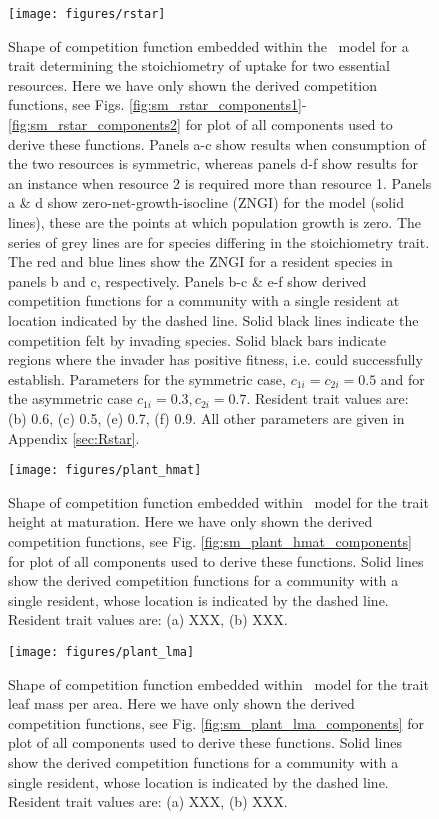 \documentclass[a4paper,11pt]{article}
\begin{document}
\begin{figure}[h]
  \centering
  \texttt{[image: figures/rstar]}
  \caption{Shape of competition function embedded within the \Rstar\ model
  for a trait determining the stoichiometry of uptake for two essential resources.
  Here we have only shown the derived  competition functions, see Figs.
  \ref{fig:sm_rstar_components1}-\ref{fig:sm_rstar_components2} for plot of all
  components used to derive these functions.
  Panels a-c show results when consumption of the two resources is symmetric, whereas
  panels d-f show results for an instance when resource 2 is required more than
  resource 1. Panels a \& d show zero-net-growth-isocline (ZNGI) for
  the  model  (solid lines), these are the points at which population growth is zero.
  The series of grey lines are for species differing in the stoichiometry trait.
  The red and blue lines show the ZNGI for a resident species in panels b and
  c, respectively. Panels b-c \& e-f show derived competition functions for a
  community with a single resident at location indicated by the dashed line.
  Solid black lines indicate the competition felt by invading species. Solid
  black bars indicate regions where the invader has positive fitness, i.e.
  could successfully establish. Parameters for the symmetric case, $c_{1i} =
  c_ {2i}=0.5$ and for the asymmetric case $c_{1i} = 0.3, c_ {2i}=0.7$. Resident
  trait values are: (b) 0.6, (c) 0.5, (e) 0.7, (f) 0.9. All other parameters
  are given in Appendix \ref{sec:Rstar}.}
  \label{fig:Rstar}
\end{figure}

\begin{figure}[h]
  \centering
  \texttt{[image: figures/plant\_hmat]}
  \caption{Shape of competition function embedded within \plant\ model for
  the trait height at maturation.
  Here we have only shown the derived  competition functions, see Fig.
  \ref{fig:sm_plant_hmat_components} for plot of all components used to derive these functions.
  Solid lines show the derived competition functions for a community with a
  single resident, whose location is indicated by the dashed line.
  Resident trait values are: (a) XXX, (b) XXX.}
  \label{fig:plant_hmat}
\end{figure}

\begin{figure}[h]
  \centering
  \texttt{[image: figures/plant\_lma]}
  \caption{Shape of competition function embedded within \plant\ model for
  the trait leaf mass per area.
  Here we have only shown the derived  competition functions, see Fig.
  \ref{fig:sm_plant_lma_components} for plot of all components used to derive these functions.
  Solid lines show the derived competition functions for a community with a
  single resident, whose location is indicated by the dashed line.
  Resident trait values are: (a) XXX, (b) XXX.}
  \label{fig:plant_lma}
\end{figure}
\end{document}
